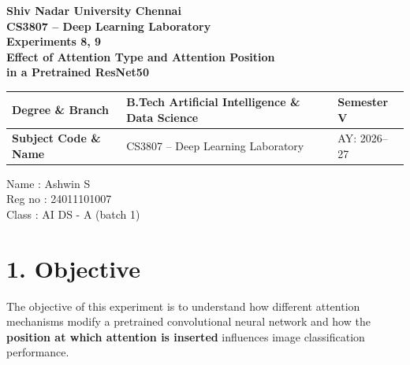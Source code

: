 \documentclass[10pt]{article}
\begin{document}

\begin{center}

{\large\textbf{Shiv Nadar University Chennai}}\\[2mm]

{\normalsize\textbf{CS3807 -- Deep Learning Laboratory}}\\[2mm]

{\large\textbf{Experiments 8, 9}}\\[1mm]

{\normalsize
\textbf{
Effect of Attention Type and Attention Position\\
in a Pretrained ResNet50
}}

\end{center}

\vspace{3mm}


\begin{center}
\begin{tabular}{|p{3.5cm}|p{8.7cm}|p{2.1cm}|}
\hline
\textbf{Degree \& Branch}
&
B.Tech Artificial Intelligence \& Data Science
&
Semester V
\\
\hline

\textbf{Subject Code \& Name}
&
CS3807 -- Deep Learning Laboratory
&
AY: 2026--27
\\
\hline
\end{tabular}
\end{center}

\vspace{4mm}
Name : Ashwin S\\
Reg no : 24011101007\\
Class : AI DS - A (batch 1)\\

\section*{1. Objective}

The objective of this experiment is to understand how different attention
mechanisms modify a pretrained convolutional neural network and how the
\textbf{position at which attention is inserted} influences image
classification performance.
\end{document}
